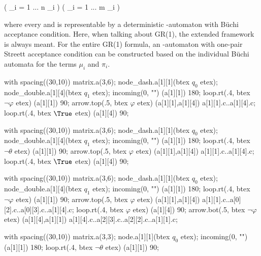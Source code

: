     \startformula
        \Big( \displaystyle\bigwedge_{i = 1 ... n} \mu_i \Big) \Longrightarrow \Big( \displaystyle\bigwedge_{i = 1 ... m} \pi_i \Big) \EndComma
    \stopformula

    where every  and  is representable by a deterministic \omega-automaton with Büchi acceptance condition. %
    Here, when talking about GR(1), the extended framework is always meant. %
    For the entire GR(1) formula, an \omega-automaton with one-pair Streett acceptance condition can be constructed based on the individual Büchi automata for the terms $\mu_i$ and $\pi_i$. %

\stopsubsection


    with spacing((30,10)) matrix.a(3,6);
    node_dash.a[1][1](btex $q_0$ etex);
    node_double.a[1][4](btex $q_1$ etex);
    incoming(0, "") (a[1][1]) 180;
    loop.rt(.4, btex \small ${\neg \varphi}$ etex) (a[1][1]) 90;
    arrow.top(.5, btex \small ${\varphi}$ etex) (a[1][1],a[1][4]) a[1][1].c..a[1][4].c;
    loop.rt(.4, btex \small ${\True}$ etex) (a[1][4]) 90;
\stopreusableMPgraphic

    with spacing((30,10)) matrix.a(3,6);
    node_dash.a[1][1](btex $q_0$ etex);
    node_double.a[1][4](btex $q_1$ etex);
    incoming(0, "") (a[1][1]) 180;
    loop.rt(.4, btex \small ${\neg \theta}$ etex) (a[1][1]) 90;
    arrow.top(.5, btex \small ${\varphi}$ etex) (a[1][1],a[1][4]) a[1][1].c..a[1][4].c;
    loop.rt(.4, btex \small ${\True}$ etex) (a[1][4]) 90;
\stopreusableMPgraphic

    with spacing((30,10)) matrix.a(3,6);
    node_dash.a[1][1](btex $q_0$ etex);
    node_double.a[1][4](btex $q_1$ etex);
    incoming(0, "") (a[1][1]) 180;
    loop.rt(.4, btex \small ${\neg \varphi}$ etex) (a[1][1]) 90;
    arrow.top(.5, btex \small ${\varphi}$ etex) (a[1][1],a[1][4]) a[1][1].c..a[0][2].c..a[0][3].c..a[1][4].c;
    loop.rt(.4, btex \small ${\varphi}$ etex) (a[1][4]) 90;
    arrow.bot(.5, btex \small ${\neg \varphi}$ etex) (a[1][4],a[1][1]) a[1][4].c..a[2][3].c..a[2][2].c..a[1][1].c;
\stopreusableMPgraphic

    with spacing((30,10)) matrix.a(3,3);
    node.a[1][1](btex $q_0$ etex);
    incoming(0, "") (a[1][1]) 180;
    loop.rt(.4, btex \small ${\neg \theta}$ etex) (a[1][1]) 90;
\stopreusableMPgraphic

